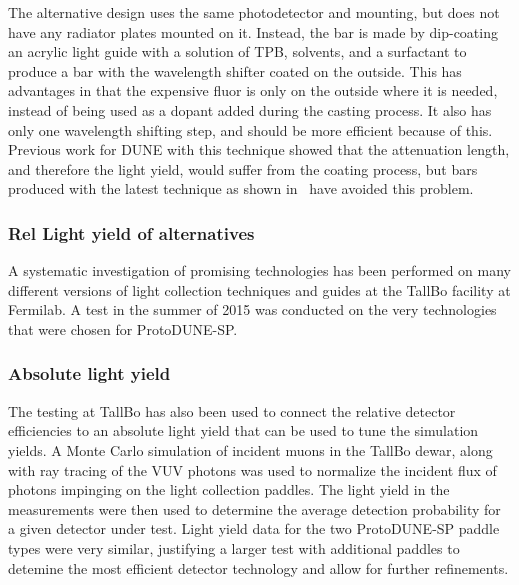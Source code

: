 The alternative design uses the same photodetector and mounting, but does not have
any radiator plates mounted on it.  
Instead, the bar is made by dip-coating an acrylic light guide with a solution
of TPB, solvents, and a surfactant to produce a bar with the wavelength shifter coated
on the outside.  
This has advantages in that the expensive fluor is only on the outside where it is
needed, instead of being used as a dopant added during the casting process.  
It also has only one wavelength shifting step, and should be more efficient because
of this.  
Previous work for DUNE with this technique showed that the attenuation length, and
therefore the light yield, would suffer from the coating process, but bars produced with
the latest technique as shown in~\cite{conrad_jinst} have %
avoided
this problem.

\subsubsection{Rel Light yield of alternatives}

A systematic investigation of promising technologies has been performed on 
many different versions of light collection techniques and guides at the 
TallBo facility at Fermilab.
A test in the summer of 2015 was conducted on the very technologies that 
were chosen for ProtoDUNE-SP. 
 

\subsubsection{Absolute light yield}
The testing at TallBo has also been used to connect the relative detector
efficiencies to an absolute light yield that can be used to tune the simulation
yields.  
A Monte Carlo simulation of incident muons in the TallBo dewar, along with ray tracing
of the VUV photons was used to normalize the incident flux of photons impinging on the
light collection paddles.  
The light yield in the measurements were then used to determine the average detection 
probability for a given detector under test.
Light yield data for the two ProtoDUNE-SP paddle types were very similar, justifying
a larger test with additional paddles to detemine the most efficient detector 
technology and allow for further refinements.

